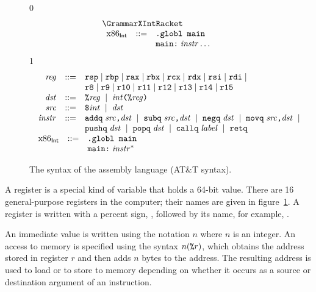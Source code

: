 \documentclass[7x10]{TimesAPriori_MIT}%
\def\racketEd{0}
\def\pythonEd{1}
\def\edition{1}
\newcommand{\pythonColor}[0]{}
\numberwithin{theorem}{chapter}
\numberwithin{definition}{chapter}
\numberwithin{equation}{chapter}
\begin{document}
\newcommand{\GrammarXIntPython}{
\begin{array}{rcl}
\Reg &::=& \allregisters{} \\
\Dst &::=&  \key{\%}\Reg \MID \Int\key{(}\key{\%}\Reg\key{)}\\
\Src &::=&  \key{\$}\Int \MID \Dst \\
\Instr &::=& \key{addq} \; \Src\key{,} \Dst \MID
      \key{subq} \; \Src\key{,} \Dst \MID
      \key{negq} \; \Dst \MID \key{movq} \; \Src\key{,} \Dst \MID \\
  &&  \key{pushq}\;\Dst \MID \key{popq}\;\Dst \MID 
      \key{callq} \; \mathit{label} \MID \key{retq} 
\end{array}
}

\begin{figure}[tp]
\begin{tcolorbox}[colback=white]
{\if\edition\racketEd    
\[
\begin{array}{l}
  \GrammarXIntRacket \\
\begin{array}{lcl}
\LangXIntM{} &::= & \key{.globl main}\\
      &    & \key{main:} \; \Instr\ldots
\end{array}
\end{array}
\]
\fi}
{\if\edition\pythonEd\pythonColor
\[
\begin{array}{l}
  \GrammarXIntPython \\
\begin{array}{lcl}
\LangXIntM{} &::= & \key{.globl main}\\
      &    & \key{main:} \; \Instr^{*}
\end{array}
\end{array}
\]
\fi}
\end{tcolorbox}
\caption{The syntax of the \LangXInt{} assembly language (AT\&T syntax).}
\label{fig:x86-int-concrete}
\end{figure}

A register is a special kind of variable that holds a 64-bit
value. There are 16 general-purpose registers in the computer; their
names are given in figure~\ref{fig:x86-int-concrete}.  A register is
written with a percent sign, \key{\%}, followed by its name,
for example, .

An immediate value is written using the notation \key{\$}$n$ where $n$
is an integer.
%
%
An access to memory is specified using the syntax $n(\texttt{\%}r)$,
which obtains the address stored in register $r$ and then adds $n$
bytes to the address. The resulting address is used to load or to store
to memory depending on whether it occurs as a source or destination
argument of an instruction.
\end{document}
